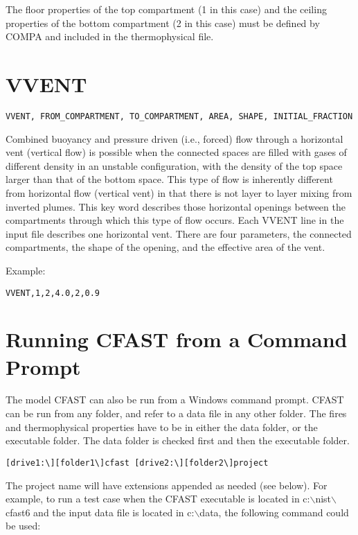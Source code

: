 The floor properties of the top compartment (1 in this case) and the ceiling properties of the bottom compartment (2 in this case) must be defined by COMPA and included in the thermophysical file.

\section{VVENT}

\begin{lstlisting}
VVENT, FROM_COMPARTMENT, TO_COMPARTMENT, AREA, SHAPE, INITIAL_FRACTION
\end{lstlisting}

Combined buoyancy and pressure driven (i.e., forced) flow through a horizontal vent (vertical flow) is possible when the connected spaces are filled with gases of different density in an unstable configuration, with the density of the top space larger than that of the bottom space. This type of flow is inherently different from horizontal flow (vertical vent) in that there is not layer to layer mixing from inverted plumes. This key word describes those horizontal openings between the compartments through which this type of flow occurs. Each VVENT line in the input file describes one horizontal vent.  There are four parameters, the connected compartments, the shape of the opening, and the effective area of the vent.

Example:

\begin{lstlisting}
VVENT,1,2,4.0,2,0.9
\end{lstlisting}



\section{Running CFAST from a Command Prompt}

The model CFAST can also be run from a Windows command prompt.  CFAST can be run from any folder, and refer to a data file in any other folder. The fires and thermophysical properties have to be in either the data folder, or the executable folder. The data folder is checked first and then the executable folder.

\begin{lstlisting}
[drive1:\][folder1\]cfast [drive2:\][folder2\]project
\end{lstlisting}

The project name will have extensions appended as needed (see below). For example, to run a test case when the CFAST executable is located in c:$\backslash$nist$\backslash$cfast6 and the input data file is located in c:$\backslash$data, the following command could be used:

